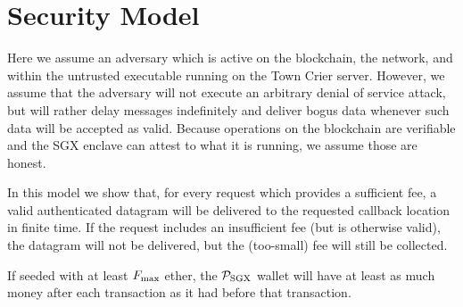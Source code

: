 \section{Security Model}

Here we assume an adversary which is active on the blockchain, the network, and within the untrusted executable running on the Town Crier server.
However, we assume that the adversary will not execute an arbitrary denial of service attack, but will rather delay messages indefinitely and deliver bogus data whenever such data will be accepted as valid.
Because operations on the blockchain are verifiable and the SGX enclave can attest to what it is running, we assume those are honest.

In this model we show that, for every request which provides a sufficient fee,
a valid authenticated datagram will be delivered to the requested callback location in finite time.
If the request includes an insufficient fee (but is otherwise valid),
the datagram will not be delivered, but the (too-small) fee will still be collected.

\begin{lemma} \label{lem:non-bankrupt-p_sgx}
If seeded with at least $F_{\rm max}$ ether, the $\mathcal{P}_\mathrm{SGX}$ wallet will have
at least as much money after each transaction as it had before that transaction.
\end{lemma}

